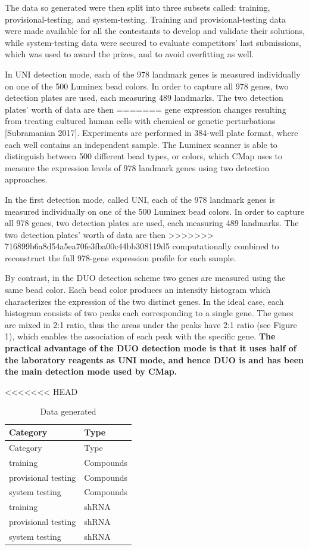 \documentclass[]{article}
\begin{document}
The data so generated were then split into three subsets called:
training, provisional-testing, and system-testing. Training and
provisional-testing data were made available for all the contestants to
develop and validate their solutions, while system-testing data were
secured to evaluate competitors' last submissions, which was used to
award the prizes, and to avoid overfitting as well.

In UNI detection mode, each of the 978 landmark genes is measured
individually on one of the 500 Luminex bead colors. In order to capture
all 978 genes, two detection plates are used, each measuring 489
landmarks. The two detection plates' worth of data are then
=======
gene expression changes resulting from treating cultured human cells
with chemical or genetic perturbations {[}Subramanian 2017{]}.
Experiments are performed in 384-well plate format, where each well
contains an independent sample. The Luminex scanner is able to
distinguish between 500 different bead types, or colors, which CMap uses
to measure the expression levels of 978 landmark genes using two
detection approaches.

In the first detection mode, called UNI, each of the 978 landmark genes
is measured individually on one of the 500 Luminex bead colors. In order
to capture all 978 genes, two detection plates are used, each measuring
489 landmarks. The two detection plates' worth of data are then
>>>>>>> 716899b6a8d54a5ea70fe3fba00c44bb308119d5
computationally combined to reconstruct the full 978-gene expression
profile for each sample.

By contrast, in the DUO detection scheme two genes are measured using
the same bead color. Each bead color produces an intensity histogram
which characterizes the expression of the two distinct genes. In the
ideal case, each histogram consists of two peaks each corresponding to a
single gene. The genes are mixed in 2:1 ratio, thus the areas under the
peaks have 2:1 ratio (see Figure 1), which enables the association of
each peak with the specific gene. \textbf{The practical advantage of the
DUO detection mode is that it uses half of the laboratory reagents as
UNI mode, and hence DUO is and has been the main detection mode used by
CMap.}

<<<<<<< HEAD
\begin{longtable}[]{@{}ll@{}}
\caption{Data generated}\tabularnewline
\toprule
Category & Type\tabularnewline
\midrule
\endfirsthead
\toprule
Category & Type\tabularnewline
\midrule
\endhead
training & Compounds\tabularnewline
provisional testing & Compounds\tabularnewline
system testing & Compounds\tabularnewline
training & shRNA\tabularnewline
provisional testing & shRNA\tabularnewline
system testing & shRNA\tabularnewline
\bottomrule
\end{longtable}
\end{document}
